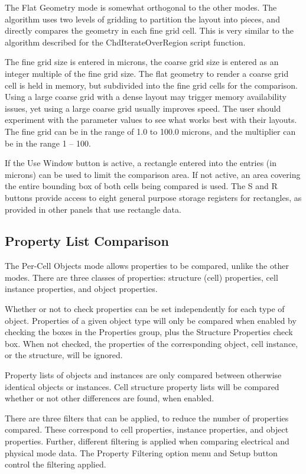 The {\cb Flat Geometry} mode is somewhat orthogonal to the other
modes.  The algorithm uses two levels of gridding to partition the
layout into pieces, and directly compares the geometry in each fine
grid cell.  This is very similar to the algorithm described for the
{\vt ChdIterateOverRegion} script function.

The fine grid size is entered in microns, the coarse grid size is
entered as an integer multiple of the fine grid size.  The flat
geometry to render a coarse grid cell is held in memory, but
subdivided into the fine grid cells for the comparison.  Using a large
coarse grid with a dense layout may trigger memory availability
issues, yet using a large coarse grid usually improves speed.  The
user should experiment with the parameter values to see what works
best with their layouts.  The fine grid can be in the range of 1.0 to
100.0 microns, and the multiplier can be in the range 1 -- 100.

If the {\cb Use Window} button is active, a rectangle entered into the
entries (in microns) can be used to limit the comparison area.  If not
active, an area covering the entire bounding box of both cells being
compared is used.  The {\cb S} and {\cb R} buttons provide access to
eight general purpose storage registers for rectangles, as provided in
other panels that use rectangle data.

\subsection{Property List Comparison}

The {\cb Per-Cell Objects} mode allows properties to be compared,
unlike the other modes.  There are three classes of properties: 
structure (cell) properties, cell instance properties, and object
properties.

Whether or not to check properties can be set independently for each
type of object.  Properties of a given object type will only be
compared when enabled by checking the boxes in the {\cb Properties}
group, plus the {\cb Structure Properties} check box.  When not
checked, the properties of the corresponding object, cell instance, or
the structure, will be ignored.

Property lists of objects and instances are only compared between
otherwise identical objects or instances.  Cell structure property
lists will be compared whether or not other differences are found,
when enabled.

There are three filters that can be applied, to reduce the number of
properties compared.  These correspond to cell properties, instance
properties, and object properties.  Further, different filtering is
applied when comparing electrical and physical mode data.  The {\cb
Property Filtering} option menu and {\cb Setup} button control the
filtering applied.

